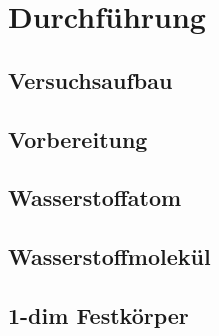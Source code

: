 \section{Durchführung}
\label{sec:Durchführung}

\subsection{Versuchsaufbau}

\subsection{Vorbereitung}

\subsection{Wasserstoffatom}

\subsection{Wasserstoffmolekül}

\subsection{1-dim Festkörper}